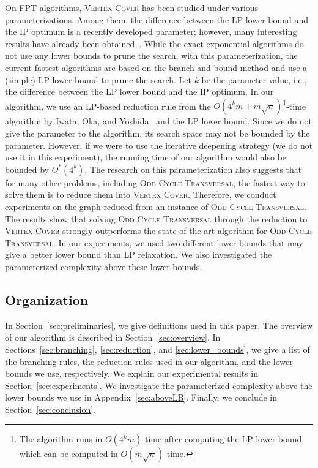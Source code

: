 \documentclass[11pt]{article}
\begin{document}
On FPT algorithms, \textsc{Vertex Cover} has been studied under various parameterizations.
Among them, the difference between the LP lower bound and the IP optimum is a recently developed parameter; however,
many interesting results have already been
obtained~\cite{DBLP:journals/toct/CyganPPW13,DBLP:journals/corr/abs-1203-0833,bip2/iwata14,DBLP:conf/soda/Wahlstrom14}.
While the exact exponential algorithms do not use any lower bounds to prune the search, with this parameterization,
the current fastest algorithms are based on the branch-and-bound method and use a (simple) LP lower bound to prune the
search.
Let $k$ be the parameter value, i.e., the difference between the LP lower bound and the IP optimum.
In our algorithm, we use an LP-based reduction rule from the $O(4^k m+m\sqrt{n})$\footnote{The algorithm runs in
$O(4^k m)$ time after computing the LP lower bound, which can be computed in $O(m\sqrt{n})$ time.}-time
algorithm by Iwata, Oka, and Yoshida~\cite{bip2/iwata14} and the LP lower bound.
Since we do not give the parameter to the algorithm, its search space may not be bounded by the
parameter.
However, if we were to use the iterative deepening strategy (we do not use it in this experiment), the running time of
our algorithm would also be bounded by $O^*(4^k)$.
The research on this parameterization also suggests that for many other problems, including \textsc{Odd Cycle
Transversal}, the fastest way to solve them is to reduce them into \textsc{Vertex Cover}.
Therefore, we conduct experiments on the graph reduced from an instance of \textsc{Odd Cycle Transversal}.
The results show that solving \textsc{Odd Cycle Transversal} through the reduction to \textsc{Vertex Cover}
strongly outperforms the state-of-the-art algorithm for \textsc{Odd Cycle Transversal}.
In our experiments, we used two different lower bounds that may give a better lower bound than LP relaxation.
We also investigated the parameterized complexity above these lower bounds.

\subsection{Organization}
In Section~\ref{sec:preliminaries}, we give definitions used in this paper.
The overview of our algorithm is described in Section~\ref{sec:overview}.
In Sections~\ref{sec:branching}, \ref{sec:reduction}, and \ref{sec:lower_bounds}, we give a list of the branching rules, the reduction
rules used in our algorithm, and the lower bounds we use, respectively.
We explain our experimental results in Section~\ref{sec:experiments}.
We investigate the parameterized complexity above the lower bounds we use in Appendix~\ref{sec:aboveLB}.
Finally, we conclude in Section~\ref{sec:conclusion}.
\end{document}
